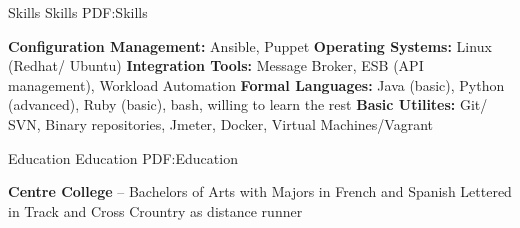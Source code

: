 \documentclass[letterpaper,MMMyyyy,nonstopmode]{simpleresumecv}
\begin{document}
\begin{Body}

\Section
{Skills}
{Skills}
{PDF:Skills}


\Entry
\textbf{Configuration Management:}
Ansible, Puppet
\Entry
\textbf{Operating Systems:}
Linux (Redhat/ Ubuntu)
\Entry
\textbf{Integration Tools:}
Message Broker, ESB (API management), Workload Automation 
\Entry
\textbf{Formal Languages:}
Java (basic), Python (advanced), Ruby (basic), bash, willing to learn the rest
\Entry
\textbf{Basic Utilites:}
Git/ SVN, Binary repositories, Jmeter, Docker, Virtual Machines/Vagrant


\Section
{Education}
{Education}
{PDF:Education}


\Entry
\textbf {Centre College}
\hfill
{} --
\BulletItem
Bachelors of Arts with Majors in French and Spanish
\BulletItem
Lettered in Track and Cross Crountry as distance runner
\end{Body}
\end{document}
